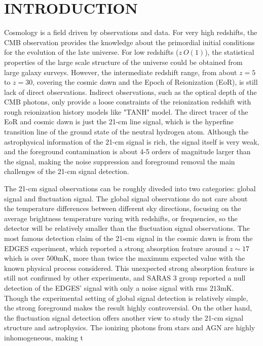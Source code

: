 \section{INTRODUCTION}
\label{sec:intro}
Cosmology is a field driven by observations and data. For very high redshifts, the CMB observation provides the knowledge about the primordial initial conditions for the evolution of the late universe. For low redshifts ($z ~ O(1)$), the statistical properties of the large scale structure of the universe could be obtained from large galaxy surveys. However, the intermediate redshift range, from about $z = 5$ to $z = 30$, covering the cosmic dawn and the Epoch of Reionization (EoR), is still lack of direct observations. Indirect observations, such as the optical depth of the CMB photons, only provide a loose constraints of the reionization redshift with rough reionization history models like "TANH" model. The direct tracer of the EoR and cosmic dawn is just the 21-cm line signal, which is the hyperfine transition line of the ground state of the neutral hydrogen atom. Although the astrophysical information of the 21-cm signal is rich, the signal itself is very weak, and the foreground contamination is about 4-5 orders of magnitude larger than the signal, making the noise suppression and foreground removal the main challenges of the 21-cm signal detection.

The 21-cm signal observations can be roughly diveded into two categories: global signal and fluctuation signal. The global signal observations do not care about the temperature differences between different sky directions, focusing on the average brightness temperature varing with redshifts, or frequencies, so the detector will be relatively smaller than the fluctuation signal observations. The most famous detection claim of the 21-cm signal in the cosmic dawn is from the EDGES experiment, which reported a strong absorption feature around $z \sim 17$ which is over $500 \text{mK}$, more than twice the maximum expected value with the known physical process considered. This unexpected strong absorption feature is still not confirmed by other experiments, and SARAS 3 group reported a null detection of the EDGES' signal with only a noise signal with rms $213 \text{mK}$. Though the experimental setting of global signal detection is relatively simple, the strong foreground makes the result highly controversial. On the other hand, the fluctuation signal detection offers another view to study the 21-cm signal structure and astrophysics. The ionizing photons from stars and AGN are highly inhomogeneous, making t